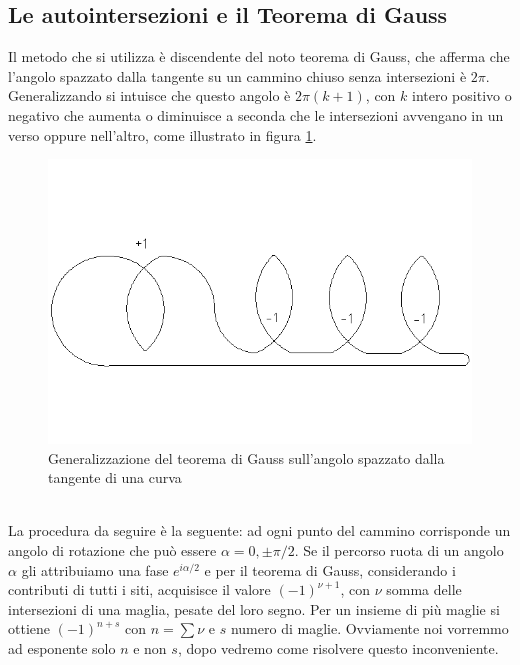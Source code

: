 \documentclass[11pt]{article}
\begin{document}
\subsection{Le autointersezioni e il Teorema di Gauss}
Il metodo che si utilizza è discendente del noto teorema di Gauss, che afferma che l'angolo spazzato dalla tangente su un cammino chiuso senza intersezioni è $2\pi$. Generalizzando si intuisce che questo angolo è $2\pi(k+1)$, con $k$ intero positivo o negativo che aumenta o diminuisce a seconda che le intersezioni avvengano in un verso oppure nell'altro, come illustrato in figura \ref{v3}.
\begin{figure}[h]
\centering
\includegraphics[width=0.7\columnwidth]{curva}
\caption{Generalizzazione del teorema di Gauss sull'angolo spazzato dalla tangente di una curva}
\label{v3}
\end{figure}
\\ La procedura da seguire è la seguente: ad ogni punto del cammino corrisponde un angolo di rotazione che può essere $\alpha=0,\pm\pi/2$. Se il percorso ruota di un angolo $\alpha$ gli attribuiamo una fase $e^{i\alpha/2}$ e per il teorema di Gauss, considerando i contributi di tutti i siti, acquisisce il valore $(-1)^{\nu+1}$, con $\nu$ somma delle intersezioni di una maglia, pesate del loro segno. Per un insieme di più maglie si ottiene $(-1)^{n+s}$ con $n=\sum\nu$ e $s$ numero di maglie. Ovviamente noi vorremmo ad esponente solo $n$ e non $s$, dopo vedremo come risolvere questo inconveniente.
\end{document}
